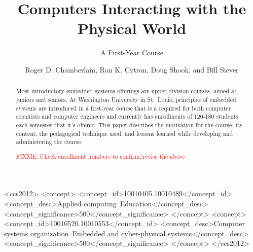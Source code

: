 \documentclass[sigconf]{acmart}
\begin{document}
\title{Computers Interacting with the Physical World}
\subtitle{A First-Year Course}


\author{Roger D. Chamberlain, Ron K. Cytron, Doug Shook, and Bill Siever}


\renewcommand{\shortauthors}{R. D. Chamberlain et al.}

\newcommand{\FIXME}[1]{\textcolor{red}{FIXME: #1}}

\begin{abstract}
Most introductory embedded systems offerings are upper-division courses, aimed at juniors and seniors.  At Washington University in St.~Louis, principles of embedded systems are introduced in a first-year course that is a required for both computer scientists and computer engineers and currently has enrollments of 120-180 students each semester that it's offered. This paper describes the motivation for the course, its content, the pedagogical technique used, and lessons learned while developing and administering the course.

\FIXME{Check enrollment numbers to confirm/revise the above}
\end{abstract}

%
%
 \begin{CCSXML}
<ccs2012>
<concept>
<concept_id>10010405.10010489</concept_id>
<concept_desc>Applied computing~Education</concept_desc>
<concept_significance>500</concept_significance>
</concept>
<concept>
<concept_id>10010520.10010553</concept_id>
<concept_desc>Computer systems organization~Embedded and cyber-physical systems</concept_desc>
<concept_significance>500</concept_significance>
</concept>
</ccs2012>
\end{CCSXML}

\end{document}
